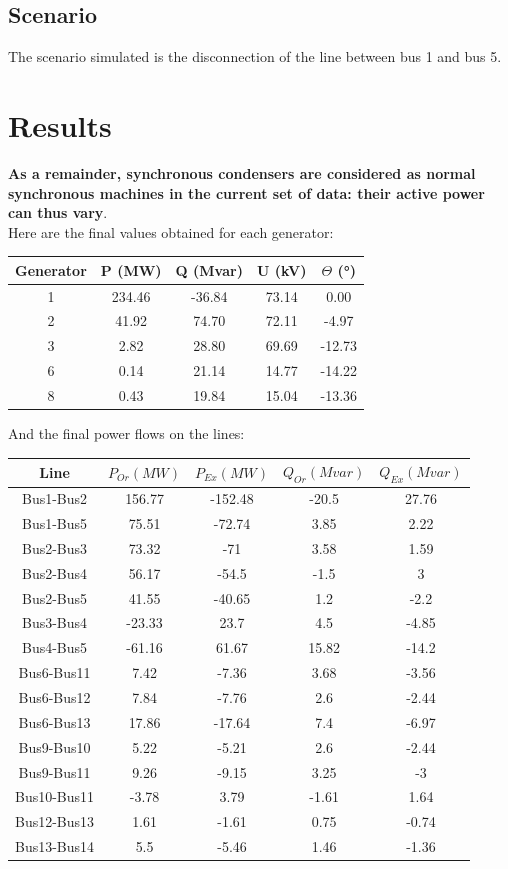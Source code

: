 \documentclass[a4paper, 12pt]{report}
\begin{document}
\subsection{Scenario}
The scenario simulated is the disconnection of the line between bus 1 and bus 5.

\newpage
\section{Results}

\textbf{As a remainder, synchronous condensers are considered as normal synchronous machines in the current set of data: their active power can thus vary}. \\

Here are the final values obtained for each generator:

\begin{center}
\begin{tabular}{|c|c|c|c|c|}
  \hline
  Generator & P (MW) & Q (Mvar) & U (kV) & $\Theta$ (°) \\
  \hline
  1 & 234.46 & -36.84 & 73.14 & 0.00\\
  2 & 41.92 & 74.70 & 72.11 & -4.97\\
  3 & 2.82 & 28.80 & 69.69 & -12.73\\
  6 & 0.14 & 21.14 & 14.77 & -14.22\\
  8 & 0.43 & 19.84 & 15.04 & -13.36\\
  \hline
\end{tabular}
\end{center}

And the final power flows on the lines:

\begin{center}
\begin{tabular}{|c|c|c|c|c|}
  \hline
  Line & $P_{Or} (MW)$ & $P_{Ex} (MW)$ & $Q_{Or} (Mvar)$ & $Q_{Ex} (Mvar)$ \\
  \hline
  Bus1-Bus2 & 156.77 & -152.48 & -20.5 & 27.76 \\
  Bus1-Bus5 & 75.51 & -72.74 & 3.85 & 2.22 \\
  Bus2-Bus3 & 73.32 & -71 & 3.58 & 1.59 \\
  Bus2-Bus4 & 56.17 & -54.5 & -1.5 & 3 \\
  Bus2-Bus5 & 41.55 & -40.65 & 1.2 & -2.2 \\
  Bus3-Bus4 & -23.33 & 23.7 & 4.5 & -4.85 \\
  Bus4-Bus5 & -61.16 & 61.67 & 15.82 & -14.2 \\
  Bus6-Bus11 & 7.42 & -7.36 & 3.68 & -3.56 \\
  Bus6-Bus12 & 7.84 & -7.76 & 2.6 & -2.44 \\
  Bus6-Bus13 & 17.86 & -17.64 & 7.4 & -6.97 \\
  Bus9-Bus10 & 5.22 & -5.21 & 2.6 & -2.44 \\
  Bus9-Bus11 & 9.26 & -9.15 & 3.25 & -3 \\
  Bus10-Bus11 & -3.78 & 3.79 & -1.61 & 1.64 \\
  Bus12-Bus13 & 1.61 & -1.61 & 0.75 & -0.74 \\
  Bus13-Bus14 & 5.5 & -5.46 & 1.46 & -1.36 \\
  \hline
\end{tabular}
\end{center}
\end{document}
